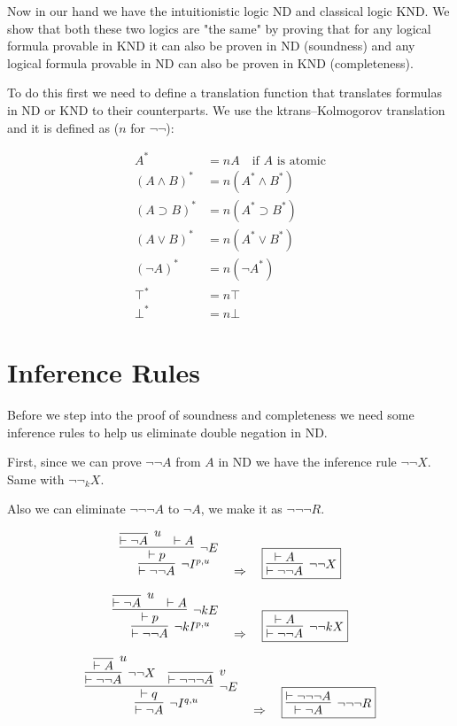 \documentclass{article}
\begin{document}
Now in our hand we have the intuitionistic logic ND
 and classical logic KND. We show that both these two
  logics are "the same" by proving that for any logical formula provable in KND it can also be proven in ND (soundness) and any logical formula provable in ND can also be proven in KND (completeness).

To do this first we need to define a translation function that translates formulas in ND or KND to their counterparts. We use the ktrans--Kolmogorov translation and it is defined as ($n$ for $\neg\neg$):

\begin{align*}
A^* &= nA \quad \text{if } A \text{ is atomic} \\
(A \land B)^* &= n(A^* \land B^*) \\
(A \supset B)^* &= n(A^* \supset B^*) \\
(A \lor B)^* &= n(A^* \lor B^*) \\
(\neg A)^* &= n(\neg A^*) \\
\top^* &= n\top \\
\bot^* &= n\bot
\end{align*}




\section{Inference Rules}
Before we step into the proof of soundness and completeness we need some 
inference rules to help us eliminate double negation in ND.

First, since we can prove $\neg\neg A$ from $A$ in ND we 
have the inference rule $\neg\neg X$. Same with $\neg\neg_{k}X$.

Also we can eliminate $\neg\neg\neg A$ to $\neg A$, we make 
it as $\neg\neg\neg R$.

\[
\infer[\neg I^{p,u}]{\vdash \neg\neg A}{
    \infer[\neg E]{\vdash p}{
        \infer [u]{\vdash \neg A}{} & \vdash A
    }
}
\quad \Rightarrow \quad
\fbox{$
    \infer[\neg \neg X]{\vdash \neg \neg A}{\vdash A}
$}
\]

\[
\infer[\neg kI^{p,u}]{\vdash \neg\neg A}{
    \infer[\neg kE]{\vdash p}{
        \infer [u]{\vdash \neg A}{} & \vdash A
    }
}
\quad \Rightarrow \quad
\fbox{$
    \infer[\neg \neg kX]{\vdash \neg \neg A}{\vdash A}
$}
\]

\[
    \infer[\neg I^{q,u}]{\vdash \neg A}{
        \infer[\neg E]{\vdash q}{ 
              \infer[\neg \neg X]{\vdash \neg \neg A}{\infer[u]{\vdash A}{}} &
              \infer[v]{\vdash \neg \neg \neg A}{}
        }
      }
\quad \Rightarrow \quad
\fbox{$
    \infer [\neg \neg \neg R]
    {\vdash \neg A}
    {\vdash \neg\neg \neg A} 
$}
\]
\end{document}
